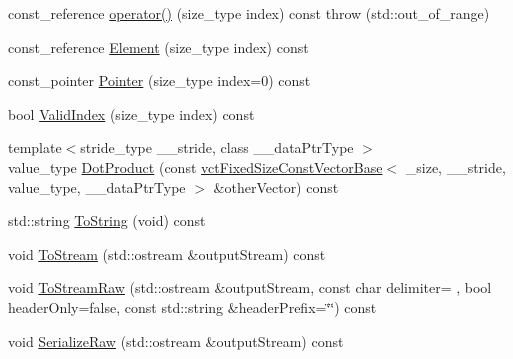 \begin{DoxyCompactItemize}
\item 
const\+\_\+reference \hyperlink{classvct_fixed_size_const_vector_base_a7e21b648dfa6753525587c1b5b45d16e}{operator()} (size\+\_\+type index) const   throw (std\+::out\+\_\+of\+\_\+range)
\item 
const\+\_\+reference \hyperlink{classvct_fixed_size_const_vector_base_a74c07af6ecdfcd5b83eb7c1296d05daa}{Element} (size\+\_\+type index) const 
\item 
const\+\_\+pointer \hyperlink{classvct_fixed_size_const_vector_base_a86ebcd642499eea0d64454a5ac944fcd}{Pointer} (size\+\_\+type index=0) const 
\item 
bool \hyperlink{classvct_fixed_size_const_vector_base_a4a1e8dbbfb96f4da5392d5bac6574f2a}{Valid\+Index} (size\+\_\+type index) const 
\item 
{\footnotesize template$<$stride\+\_\+type \+\_\+\+\_\+stride, class \+\_\+\+\_\+data\+Ptr\+Type $>$ }\\value\+\_\+type \hyperlink{classvct_fixed_size_const_vector_base_ad33a3f89474cac17f0f917a0725106da}{Dot\+Product} (const \hyperlink{classvct_fixed_size_const_vector_base}{vct\+Fixed\+Size\+Const\+Vector\+Base}$<$ \+\_\+size, \+\_\+\+\_\+stride, value\+\_\+type, \+\_\+\+\_\+data\+Ptr\+Type $>$ \&other\+Vector) const 
\item 
std\+::string \hyperlink{classvct_fixed_size_const_vector_base_ab28c36ca88b582037a197d5b37fb6a20}{To\+String} (void) const 
\item 
void \hyperlink{classvct_fixed_size_const_vector_base_abec81757524558b2c393646313f31163}{To\+Stream} (std\+::ostream \&output\+Stream) const 
\item 
void \hyperlink{classvct_fixed_size_const_vector_base_aa413d5dd8a954fe8e36b21299f5181aa}{To\+Stream\+Raw} (std\+::ostream \&output\+Stream, const char delimiter= \textquotesingle{} \textquotesingle{}, bool header\+Only=false, const std\+::string \&header\+Prefix=\char`\"{}\char`\"{}) const 
\item 
void \hyperlink{classvct_fixed_size_const_vector_base_a3b7b8125332df76aec10b7053339e691}{Serialize\+Raw} (std\+::ostream \&output\+Stream) const 
\end{DoxyCompactItemize}
